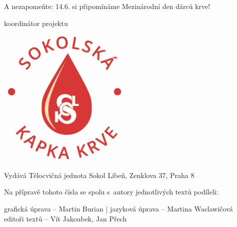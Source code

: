 \documentclass[11pt]{article}
\begin{document}
A nezapomeňte: 14.6. si připomínáme Mezinárodní den dárců krve!

\signature{Vít Jakoubek}{koordinátor projektu}
\vspace*{24pt}

\begin{center}
  \includegraphics[width=0.5\textwidth]{./sokolska_kapka_krve.jpg}
  \end{center}
  

\clearpage

\pagestyle{blank}

\vspace*{96pt}

\pagecolor{sokolred}
\color{white}


\vspace*{\fill}

\begin{center}
Vydává Tělocvičná jednota Sokol Libeň, Zenklova 37, Praha 8

\vspace*{12pt}

Na přípravě tohoto čísla se spolu s~autory jednotlivých textů podíleli:

grafická úprava – Martin Burian | jazyková úprava – Martina Waclawičová \\ editoři textů – Vít Jakoubek, Jan Přech
\end{center}
\end{document}
